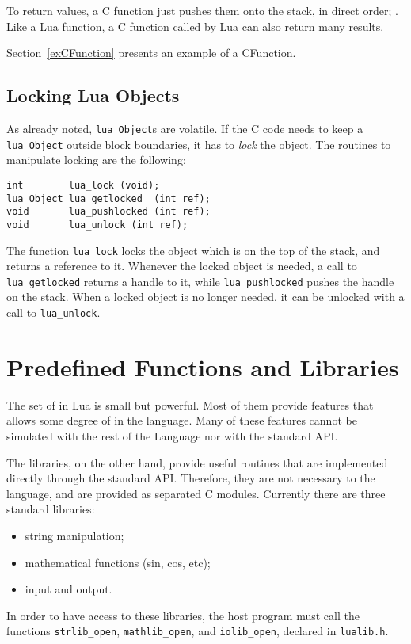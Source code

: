 To return values, a C function just pushes them onto the stack,
in direct order; .
Like a Lua function, a C function called by Lua can also return
many results.

Section~\ref{exCFunction} presents an example of a CFunction.


\subsection{Locking Lua Objects}

As already noted, \verb'lua_Object's are volatile.
If the C code needs to keep a \verb'lua_Object'
outside block boundaries,
it has to {\em lock} the object.
The routines to manipulate locking are the following:
\begin{verbatim}
int        lua_lock (void);
lua_Object lua_getlocked  (int ref);
void       lua_pushlocked (int ref);
void       lua_unlock (int ref);
\end{verbatim}
The function \verb'lua_lock' locks the object
which is on the top of the stack,
and returns a reference to it.
Whenever the locked object is needed,
a call to \verb'lua_getlocked'
returns a handle to it,
while \verb'lua_pushlocked' pushes the handle on the stack.
When a locked object is no longer needed,
it can be unlocked with a call to \verb'lua_unlock'.



\section{Predefined Functions and Libraries}

The set of  in Lua is small but powerful.
Most of them provide features that allows some degree of
 in the language.
Many of these features cannot be simulated with the rest of the
Language nor with the standard API.

The libraries, on the other hand, provide useful routines
that are implemented directly through the standard API.
Therefore, they are not necessary to the language,
and are provided as separated C modules.
Currently there are three standard libraries:
\begin{itemize}
\item string manipulation;
\item mathematical functions (sin, cos, etc);
\item input and output.
\end{itemize}
In order to have access to these libraries,
the host program must call the functions
\verb-strlib_open-, \verb-mathlib_open-, and \verb-iolib_open-,
declared in \verb-lualib.h-.


